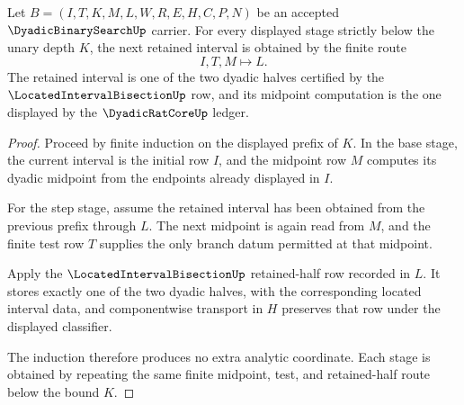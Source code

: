 \begin{theorem}
\label{thm:dyadic-binary-search-bisection-step}
Let $B=(I,T,K,M,L,W,R,E,H,C,P,N)$ be an accepted $\DyadicBinarySearchUp$ carrier. For every displayed stage strictly below the unary depth $K$, the next retained interval is obtained by the finite route
$$
I,T,M\longmapsto L .
$$
The retained interval is one of the two dyadic halves certified by the $\LocatedIntervalBisectionUp$ row, and its midpoint computation is the one displayed by the $\DyadicRatCoreUp$ ledger.
\end{theorem}
\begin{proof}
Proceed by finite induction on the displayed prefix of $K$. In the base stage, the current interval is the initial row $I$, and the midpoint row $M$ computes its dyadic midpoint from the endpoints already displayed in $I$.

For the step stage, assume the retained interval has been obtained from the previous prefix through $L$. The next midpoint is again read from $M$, and the finite test row $T$ supplies the only branch datum permitted at that midpoint.

Apply the $\LocatedIntervalBisectionUp$ retained-half row recorded in $L$. It stores exactly one of the two dyadic halves, with the corresponding located interval data, and componentwise transport in $H$ preserves that row under the displayed classifier.

The induction therefore produces no extra analytic coordinate. Each stage is obtained by repeating the same finite midpoint, test, and retained-half route below the bound $K$.
\end{proof}

